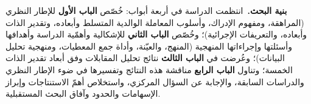 \medskip
\noindent\textbf{بنية البحث.}\ انتظمت الدراسة في أربعة أبواب: خُصّص \textbf{الباب الأول} للإطار
النظري (المراهقة، ومفهوم الإدراك، وأسلوب المعاملة الوالدية المتسلط وأبعاده، وتقدير الذات وأبعاده،
والتعريفات الإجرائية)؛ وخُصّص \textbf{الباب الثاني} للإشكالية وأهمّية الدراسة وأهدافها وأسئلتها
وإجراءاتها المنهجية (المنهج، والعيّنة، وأداة جمع المعطيات، ومنهجية تحليل البيانات)؛ وعُرضت في
\textbf{الباب الثالث} نتائج تحليل المقابلات وفق أبعاد تقدير الذات الخمسة؛ وتناول \textbf{الباب
الرابع} مناقشة هذه النتائج وتفسيرها في ضوء الإطار النظري والدراسات السابقة، والإجابة عن السؤال
المركزي، واستخلاص أهمّ الاستنتاجات وإبراز الإسهامات والحدود وآفاق البحث المستقبلية.
